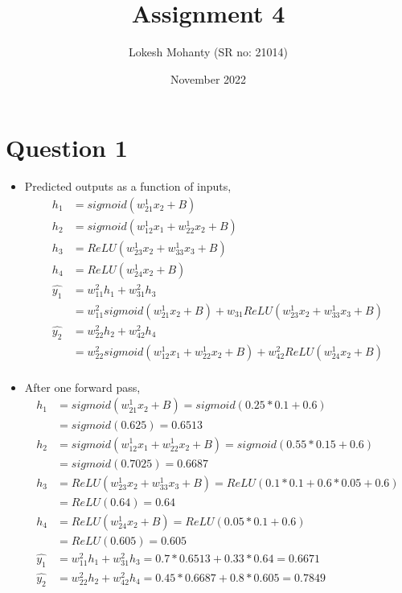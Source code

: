 \documentclass[12pt, letterpaper]{article}
\title{Assignment 4}
\author{Lokesh Mohanty (SR no: 21014)}
\date{November 2022}
\begin{document}
\maketitle

\section*{Question 1}

\begin{itemize}
\item Predicted outputs as a function of inputs,
\begin{align*}
  h_1 &= sigmoid(w_{21}^1x_2 + B) \\
  h_2 &= sigmoid(w_{12}^1x_1 + w_{22}^1x_2 + B) \\
  h_3 &= ReLU(w_{23}^1x_2 + w_{33}^1x_3 + B) \\
  h_4 &= ReLU(w_{24}^1x_2 + B) \\
  \hat{y_1} &= w_{11}^2h_1 + w_{31}^2h_3 \\
  &= w_{11}^2sigmoid(w_{21}^1x_2 + B) + w_{31}ReLU(w_{23}^1x_2 + w_{33}^1x_3 + B) \\
  \hat{y_2} &= w_{22}^2h_2 + w_{42}^2h_4 \\
  &= w_{22}^2sigmoid(w_{12}^1x_1 + w_{22}^1x_2 + B) + w_{42}^2ReLU(w_{24}^1x_2 + B) \\
\end{align*}

\item After one forward pass,
\begin{align*}
  h_1 &= sigmoid(w_{21}^1x_2 + B) = sigmoid(0.25 * 0.1 + 0.6) \\
  &= sigmoid(0.625) = 0.6513\\
  h_2 &= sigmoid(w_{12}^1x_1 + w_{22}^1x_2 + B) = sigmoid(0.55 * 0.15 + 0.6) \\
  &= sigmoid(0.7025) = 0.6687\\
  h_3 &= ReLU(w_{23}^1x_2 + w_{33}^1x_3 + B) = ReLU(0.1*0.1 + 0.6*0.05 + 0.6) \\
  &= ReLU(0.64) = 0.64\\
  h_4 &= ReLU(w_{24}^1x_2 + B) = ReLU(0.05*0.1 + 0.6) \\
  &= ReLU(0.605) = 0.605\\
  \hat{y_1} &= w_{11}^2h_1 + w_{31}^2h_3 = 0.7*0.6513 + 0.33*0.64 = 0.6671\\
  \hat{y_2} &= w_{22}^2h_2 + w_{42}^2h_4 = 0.45*0.6687 + 0.8*0.605 = 0.7849\\
\end{align*}


\end{itemize}
\end{document}
